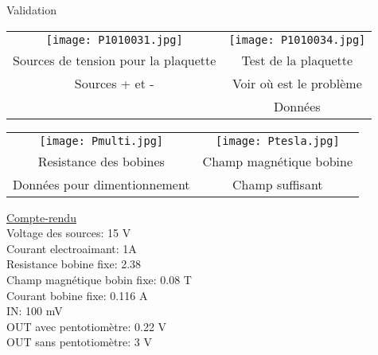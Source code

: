 \documentclass[pdf]{beamer}
\begin{document}
\begin{frame}{Validation}

\begin{tabular}{cc}
   \texttt{[image: P1010031.jpg]}& 
   \texttt{[image: P1010034.jpg]} \\
	Sources de tension pour la plaquette & Test de la plaquette\\
  Sources + et - & Voir où est le problème\\
	& Données
\end{tabular}
\end{frame}



\begin{frame}

\begin{tabular}{cc}
   \texttt{[image: Pmulti.jpg]}& 
   \texttt{[image: Ptesla.jpg]} \\
	Resistance des bobines & Champ magnétique bobine\\
	Données pour dimentionnement& Champ suffisant\\
\end{tabular}
\end{frame}



\begin{frame}
\center\large\underline{Compte-rendu}\\


Voltage des sources:  15 V
\\
Courant electroaimant: 1A
\\
Resistance bobine fixe: 2.38 \Omega
\\
Champ magnétique bobin fixe: 0.08 T
\\
Courant bobine fixe: 0.116 A
\\
IN: 100 mV
\\
OUT avec pentotiomètre: 0.22 V
\\
OUT sans pentotiomètre: 3 V	

\end{frame}
\end{document}

